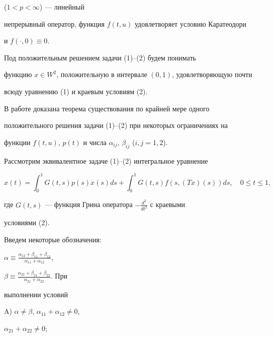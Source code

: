 ($1<p<\infty$) --- линейный 


непрерывный оператор, функция $f(t,u)$ удовлетворяет условию Каратеодори 


и $f(\cdot,0)\equiv0$. 


 


Под положительным решением задачи (1)--(2) будем понимать 


функцию $x\in W^2$, положительную в интервале $(0,1)$, удовлетворяющую почти 


всюду уравнению (1) и краевым условиям (2). 


 


В работе доказана теорема существования по крайней мере одного 


положительного решения задачи (1)--(2) при некоторых ограничениях на 


функции $f(t,u)$, $p(t)$ и числа $\alpha_{ij}$, $\beta_{ij}$ ($i,j=1,2$). 


Рассмотрим эквивалентное задаче (1)--(2) интегральное уравнение 


\begin{equation} 


x(t)=\int^1_0 G(t,s)p(s)x(s)ds+\int^1_0 G(t,s) 


f(s,(Tx)(s))ds,\quad 0\le t\le 1, 


\end{equation} 


где $G(t,s)$ --- функция Грина оператора $-\frac{d^2}{dt^2}$ с краевыми 


условиями (2). 


 


Введем некоторые обозначения: 


$\alpha\equiv\frac{\alpha_{12}+\beta_{11}+\beta_{12}} 


{\alpha_{11}+\alpha_{12}}$, 


$\beta\equiv\frac{\alpha_{22}+\beta_{21}+\beta_{22}} 


{\alpha_{21}+\alpha_{22}}$. При 


выполнении условий 


 


A) $\alpha\ne\beta$, $\alpha_{11}+\alpha_{12}\ne0$, 


$\alpha_{21}+\alpha_{22}\ne0$; 


 


